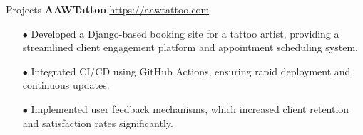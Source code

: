 \begin{rSection}{Projects}
\vspace{0.12cm}
{\bf AAWTattoo}
\hspace{2 cm}{Django, Web Development, GitHub Actions}
\hfill{\href{https://aawtattoo.com}{https://aawtattoo.com}}
\begin{itemize}[label=\myfancylabel, leftmargin=0.5cm, topsep=-5pt]
    \item[$\bullet$] Developed a Django-based booking site for a tattoo artist, providing a 
          streamlined client engagement platform and appointment scheduling system.
    \item[$\bullet$] Integrated CI/CD using GitHub Actions, ensuring rapid deployment and 
          continuous updates.
    \item[$\bullet$] Implemented user feedback mechanisms, which increased client retention and 
          satisfaction rates significantly.
\end{itemize}
\end{rSection}